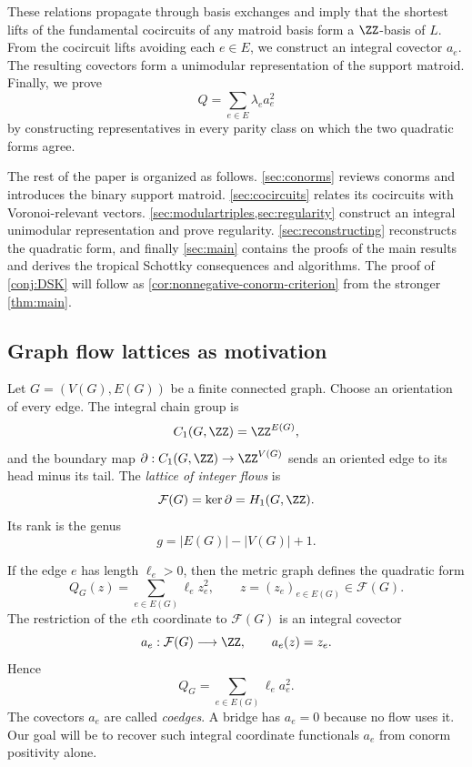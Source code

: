\documentclass[11pt,letterpaper]{amsart}
\begin{document}
These relations propagate through basis exchanges and imply that the shortest lifts of the fundamental cocircuits of any matroid basis form a $\ZZ$-basis of $L$. From the cocircuit lifts avoiding each $e\in E$, we construct an integral covector $a_e$. The resulting covectors form a unimodular representation of the support matroid.
Finally, we prove
\[
    Q=\sum_{e\in E}\lambda_ea_e^2
\]
by constructing representatives in every parity class on which the two quadratic forms agree.

The rest of the paper is organized as follows. \cref{sec:conorms} reviews conorms and introduces the binary support matroid. \cref{sec:cocircuits} relates its cocircuits with Voronoi-relevant vectors. \cref{sec:modulartriples,sec:regularity} construct an integral unimodular representation and prove regularity. \cref{sec:reconstructing} reconstructs the quadratic form, and finally \cref{sec:main} contains the proofs of the main results and derives the tropical Schottky consequences and algorithms. The proof of \cref{conj:DSK} will follow as \cref{cor:nonnegative-conorm-criterion} from the stronger \cref{thm:main}.


\subsection{Graph flow lattices as motivation}\label{sec:motivation}

Let $G=(V(G),E(G))$ be a finite connected graph.  Choose an orientation of every edge.  The integral chain group is
\[
  C_1(G,\ZZ)=\ZZ^{E(G)},
\]
and the boundary map $\partial:C_1(G,\ZZ)\to \ZZ^{V(G)}$ sends an oriented edge to its head minus its tail.  The \emph{lattice of integer flows} is
\[
  \mathcal F(G)=\ker\partial=H_1(G,\ZZ).
\]
Its rank is the genus
\[
  g=|E(G)|-|V(G)|+1.
\]

If the edge $e$ has length $\ell_e>0$, then the metric graph defines the quadratic form
\[
  Q_G(z)=\sum_{e\in E(G)}\ell_e z_e^2,
  \qquad z=(z_e)_{e\in E(G)}\in \mathcal F(G).
\]
The restriction of the $e$th coordinate to $\mathcal F(G)$ is an integral covector
\[
  a_e:\mathcal F(G)\longrightarrow\ZZ,
  \qquad a_e(z)=z_e.
\]
Hence
\begin{equation*}
  Q_G=\sum_{e\in E(G)}\ell_e a_e^2.
\end{equation*}
The covectors $a_e$ are called \emph{coedges}.  A bridge has $a_e=0$ because no flow uses it. Our goal will be to recover such integral coordinate functionals $a_e$ from conorm positivity alone.
\end{document}
